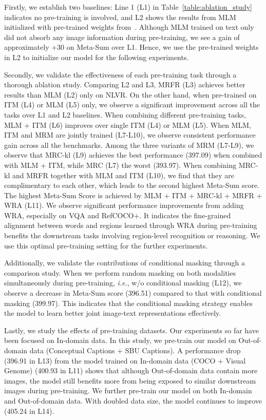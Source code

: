 \documentclass[runningheads]{llncs}
\begin{document}
Firstly, we establish two baselines:
Line 1 (L1) in Table~\ref{table:ablation_study} indicates no pre-training is involved, and L2 shows the results from MLM initialized with pre-trained weights from~\cite{devlin2018bert}.
Although MLM trained on text only did not absorb any image information during pre-training, we see a gain of approximately +30 on Meta-Sum over L1. 
Hence, 
we use the pre-trained weights in L2 to initialize our model for the following experiments.

Secondly, we validate the effectiveness of each pre-training task through a thorough ablation study. 
Comparing L2 and L3, MRFR (L3) achieves better results than MLM (L2) only on NLVR.
On the other hand, when pre-trained on ITM (L4) or MLM (L5) only, we observe a significant improvement across all the tasks over L1 and L2 baselines. 
When combining different pre-training tasks, MLM + ITM (L6) improves over single ITM (L4) or MLM (L5). 
When MLM, ITM and MRM are jointly trained (L7-L10), we observe consistent performance gain across all the benchmarks. 
Among the three variants of MRM (L7-L9), we observe that MRC-kl (L9) achieves the best performance (397.09) when combined with MLM + ITM, while MRC (L7) the worst (393.97). 
When combining MRC-kl and MRFR together with MLM and ITM (L10), we find that they are complimentary to each other, which leads to the second highest Meta-Sum score. 
The highest Meta-Sum Score is achieved by MLM + ITM + MRC-kl + MRFR + WRA (L11). 
We observe significant performance improvements from adding WRA, especially on VQA and RefCOCO+.
It indicates the fine-grained alignment between words and regions learned through WRA during pre-training benefits the downstream tasks involving region-level recognition or reasoning. 
We use this optimal pre-training setting for the further experiments. 

Additionally, we validate the contributions of conditional masking through a comparison study. When we perform random masking on both modalities simultaneously during pre-training, \emph{i.e.}, w/o conditional masking (L12), we observe a decrease in Meta-Sum score (396.51) compared to that with conditional masking (399.97). This indicates that the conditional masking strategy enables the model to learn better joint image-text representations effectively.


Lastly, we study the effects of pre-training datasets. Our experiments so far have been focused on In-domain data. In this study, we pre-train our model on Out-of-domain data (Conceptual Captions + SBU Captions). A performance drop (396.91 in L13) from the model trained on In-domain data (COCO + Visual Genome) (400.93 in L11) shows that although Out-of-domain data contain more images, the model still benefits more from being exposed to similar downstream images during pre-training. 
We further pre-train our model on both In-domain and Out-of-domain data. 
With doubled data size, the model continues to improve (405.24 in L14).
\end{document}

